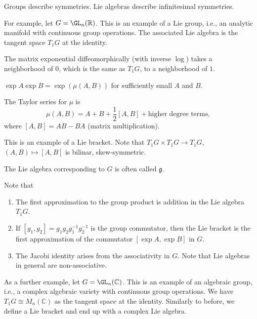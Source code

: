 Groups describe symmetries. Lie algebras describe infinitesimal symmetries.

For example, let $G = \GL_n(\mathbb{R})$. This is an example of a Lie group,
i.e., an analytic manifold with continuous group operations. The associated
Lie algebra is the tangent space $T_1G$ at the identity.

The matrix exponential diffeomorphically (with inverse $\log$) takes a
neighborhood of $0$, which is the same as $T_1G$, to a neighborhood of $1$. 

$\exp A\exp B = \exp(\mu(A, B))$ for sufficiently small $A$ and $B$.

The Taylor series for $\mu$ is
\[ \mu(A, B) = A + B + \frac{1}{2}[A, B] + \text{higher degree terms}, \]
where $[A, B] = AB - BA$ (matrix multiplication).

This is an example of a Lie bracket. Note that $T_1G\times T_1G \to T_1G$,
$(A, B)\mapsto [A, B]$ is bilinar, skew-symmetric.

The Lie algebra corresponding to $G$ is often called $\mathfrak{g}$.

Note that
\begin{enumerate}[label=(\arabic*)]
	\item The first approximation to the group product is addition in the Lie algebra
		$T_1G$.
	\item If $[g_1, g_2] = g_1g_2g_1^{-1}g_2^{-1}$ is the group commutator, then
		the Lie bracket is the first approximation of the commutator
		$[\exp A, \exp B]$ in $G$.
	\item The Jacobi identity arises from the associativity in $G$. Note that
		Lie algebras in general are non-associative.
\end{enumerate}

As a further example, let $G = \GL_n(\mathbb{C})$. This is an example of an
algebraic group, i.e., a complex algebraic variety with continuous group
operations. We have $T_1G \cong M_n(\mathbb{C})$ as the tangent space at the
identity. Similarly to before, we define a Lie bracket and end up with a complex
Lie algebra.
